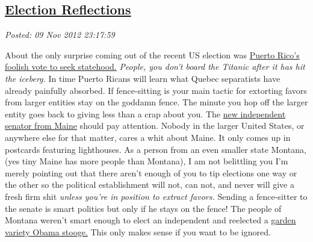 %

\subsection*{\href{http://bakerjd99.wordpress.com/2012/11/09/election-reflections/}{Election Reflections}}


\noindent\emph{Posted: 09 Nov 2012 23:17:59}
\vspace{6pt}

About the only surprise coming out of the recent US election was
\href{http://www.guardian.co.uk/commentisfree/2012/nov/09/puerto-rico-vote-us-statehood}{Puerto
Rico's foolish vote to seek statehood.} \emph{People, you don't board
the Titanic after it has hit the iceberg.} In time Puerto Ricans will
learn what Quebec separatists have already painfully absorbed. If
fence-sitting is your main tactic for extorting favors from larger
entities stay on the goddamn fence. The minute you hop off the larger
entity goes back to giving less than a crap about you.
The \href{http://www.philly.com/philly/news/nation\_world/20121109\_Maine\_s\_senator-elect\_won\_t\_say\_which\_party\_he\_will\_back.html}{new
independent senator from Maine} should pay attention. Nobody in the
larger United States, or anywhere else for that matter, cares a whit
about Maine. It only comes up in postcards featuring lighthouses. As a
person from an even smaller state Montana, (yes tiny Maine has more
people than Montana), I am not belittling you I'm merely pointing out
that there aren't enough of you to tip elections one way or the other so
the political establishment will not, can not, and never will give a
fresh firm shit \emph{unless you're in position to extract favors.}
Sending a fence-sitter to the senate is smart politics but only if he
stays on the fence! The people of Montana weren't smart enough to elect
an independent and reelected a
\href{http://www.washingtonpost.com/blogs/the-fix/wp/2012/11/07/democrat-jon-tester-wins-reelection-in-montana-senate-race/}{garden
variety Obama stooge.} This only makes sense if you want to be ignored.

